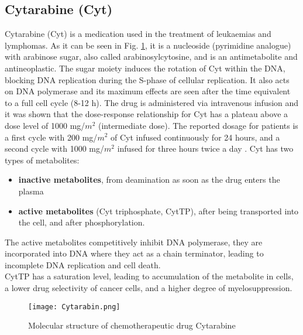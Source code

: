 \subsection{Cytarabine (Cyt)}
Cytarabine (Cyt) is a medication used in the treatment of leukaemias and lymphomas. As it can be seen in Fig. \ref{fig:Cyt}, it is a nucleoside (pyrimidine analogue) with arabinose sugar, also called arabinosylcytosine, and is an antimetabolite and antineoplastic.
The sugar moiety induces the rotation of Cyt within the DNA, blocking DNA replication during the S-phase of cellular replication. It also acts on DNA polymerase and its maximum effects are seen after the time equivalent to a full cell cycle (8-12 h). 
The drug is administered via intravenous infusion and it was shown that the dose-response relationship for Cyt has a plateau above a dose level of 1000 mg/$m^2$ (intermediate dose). The reported dosage for patients is a first cycle with 200 mg/$m^2$ of Cyt infused continuously for 24 hours, and a second cycle with 1000 mg/$m^2$ infused for three hours twice a day \cite{cyt-3}.
Cyt has two types of metabolites: 
\begin{itemize}
	\item \textbf{inactive metabolites}, from deamination as soon as the drug enters the plasma
	\item \textbf{active metabolites} (Cyt triphosphate, CytTP), after being transported into the cell, and after phosphorylation.
\end{itemize}
The active metabolites competitively inhibit DNA polymerase, they are incorporated into DNA where they act as a chain terminator, leading to incomplete DNA replication and cell death.\\
CytTP has a saturation level, leading to accumulation of the metabolite in cells, a lower drug selectivity of cancer cells, and a higher degree of myelosuppression.\cite{cyt-1, cyt-2}
\begin{figure}[htbp!]
	\centering
	\texttt{[image: Cytarabin.png]}
	\caption{Molecular structure of chemotherapeutic drug Cytarabine}
	\label{fig:Cyt}
\end{figure}
